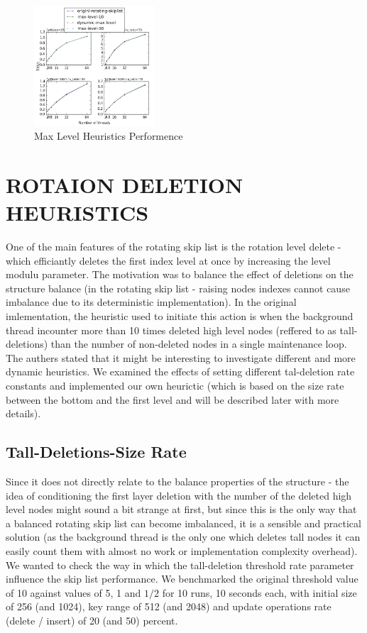 \documentclass{article}
\begin{document}
\begin{figure}
	\caption{Max Level Heuristics Performence}
	\centering
	\includegraphics[width=0.4\textwidth]{max-level_plot}
\end{figure}


\section{ROTAION DELETION HEURISTICS}
\label{sec:rdh}

One of the main features of the rotating skip list is the rotation level delete - which efficiantly deletes the first index level at once by increasing the level modulu parameter. The motivation was to balance the effect of deletions on the structure balance (in the rotating skip list - raising nodes indexes cannot cause imbalance due to its deterministic implementation). In the original imlementation, the heuristic used to initiate this action is when the background thread incounter more than 10 times deleted high level nodes (reffered to as tall-deletions) than the number of non-deleted nodes in a single maintenance loop. The authers stated that it might be interesting to investigate different and more dynamic heuristics. We examined the effects of setting different tal-deletion rate constants and implemented our own heurictic (which is based on the size rate between the bottom and the first level and will be described later with more details).

\subsection{Tall-Deletions-Size Rate}
\label{ssec:tds}

Since it does not directly relate to the balance properties of the structure - the idea of conditioning the first layer deletion with the number of the deleted high level nodes might sound a bit strange at first, but since this is the only way that a balanced rotating skip list can become imbalanced, it is a sensible and practical solution (as the background thread is the only one which deletes tall nodes it can easily count them with almost no work or implementation complexity overhead). We wanted to check the way in which the tall-deletion threshold rate parameter influence the skip list performance. We benchmarked the original threshold value of 10 against values of 5, 1 and $1/2$ for 10 runs, 10 seconds each, with initial size of 256 (and 1024), key range of 512 (and 2048) and update operations rate (delete / insert) of 20 (and 50) percent.
\end{document}
